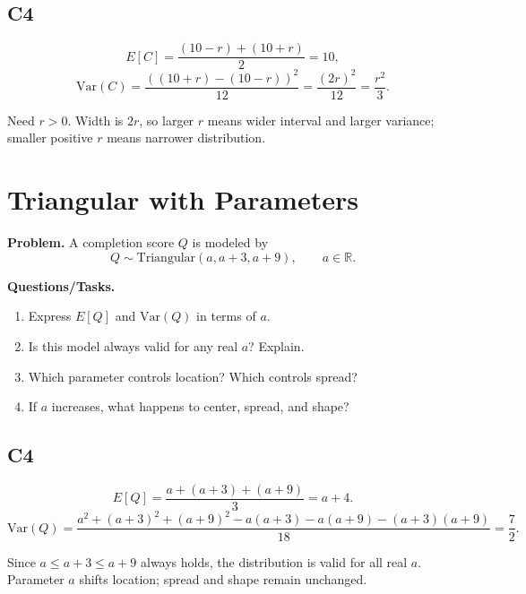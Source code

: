 \subsection*{C4}
\[
E[C]=\frac{(10-r)+(10+r)}{2}=10,
\]
\[
\mathrm{Var}(C)=\frac{((10+r)-(10-r))^2}{12}=\frac{(2r)^2}{12}=\frac{r^2}{3}.
\]
\begin{center}
\end{center}
Need \(r>0\). Width is \(2r\), so larger \(r\) means wider interval and larger variance; smaller positive \(r\) means narrower distribution.

\section{Triangular with Parameters}

\textbf{Problem.}
A completion score \(Q\) is modeled by
\[
Q\sim \text{Triangular}(a,a+3,a+9),\qquad a\in\mathbb{R}.
\]

\textbf{Questions/Tasks.}
\begin{enumerate}[label=\textbf{\alph*)}]
  \item Express \(E[Q]\) and \(\mathrm{Var}(Q)\) in terms of \(a\).
  \item Is this model always valid for any real \(a\)? Explain.
  \item Which parameter controls location? Which controls spread?
  \item If \(a\) increases, what happens to center, spread, and shape?
\end{enumerate}

\subsection*{C4}
\[
E[Q]=\frac{a+(a+3)+(a+9)}{3}=a+4.
\]
\[
\mathrm{Var}(Q)=\frac{a^2+(a+3)^2+(a+9)^2-a(a+3)-a(a+9)-(a+3)(a+9)}{18}=\frac{7}{2}.
\]
\begin{center}
\end{center}
Since \(a\le a+3\le a+9\) always holds, the distribution is valid for all real \(a\). Parameter \(a\) shifts location; spread and shape remain unchanged.

